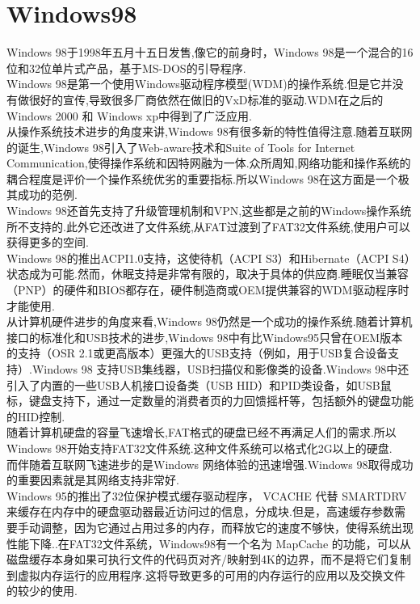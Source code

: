 \documentclass[a4paper,12pt,notitlepage]{article}
\begin{document}
\section{Windows98}

	Windows 98于1998年五月十五日发售,像它的前身时，Windows 98是一个混合的16位和32位单片式产品，基于MS-DOS的引导程序. \\
	
	Windows 98是第一个使用Windows驱动程序模型(WDM)的操作系统.但是它并没有做很好的宣传,导致很多厂商依然在做旧的VxD标准的驱动.WDM在之后的Windows 2000 和 Windows xp中得到了广泛应用. \\
	
	从操作系统技术进步的角度来讲,Windows 98有很多新的特性值得注意.随着互联网的诞生,Windows 98引入了Web-aware技术和Suite of Tools for Internet Communication,使得操作系统和因特网融为一体.众所周知,网络功能和操作系统的耦合程度是评价一个操作系统优劣的重要指标.所以Windows 98在这方面是一个极其成功的范例. \\
	
	Windows 98还首先支持了升级管理机制和VPN,这些都是之前的Windows操作系统所不支持的.此外它还改进了文件系统,从FAT过渡到了FAT32文件系统,使用户可以获得更多的空间. \\
	
	Windows 98的推出ACPI1.0支持，这使待机（ACPI S3）和Hibernate（ACPI S4）状态成为可能.然而，休眠支持是非常有限的，取决于具体的供应商.睡眠仅当兼容（PNP）的硬件和BIOS都存在，硬件制造商或OEM提供兼容的WDM驱动程序时才能使用. \\
	
	从计算机硬件进步的角度来看,Windows 98仍然是一个成功的操作系统.随着计算机接口的标准化和USB技术的进步,Windows 98中有比Windows95只曾在OEM版本的支持（OSR 2.1或更高版本）更强大的USB支持（例如，用于USB复合设备支持）.Windows 98 支持USB集线器，USB扫描仪和影像类的设备.Windows 98中还引入了内置的一些USB人机接口设备类（USB HID）和PID类设备，如USB鼠标，键盘支持下，通过一定数量的消费者页的力回馈摇杆等，包括额外的键盘功能的HID控制. \\
	
	随着计算机硬盘的容量飞速增长,FAT格式的硬盘已经不再满足人们的需求.所以Windows 98开始支持FAT32文件系统.这种文件系统可以格式化2G以上的硬盘. \\
	
	而伴随着互联网飞速进步的是Windows 网络体验的迅速增强.Windows 98取得成功的重要因素就是其网络支持非常好. \\
	
	Windows 95的推出了32位保护模式缓存驱动程序， VCACHE 代替  SMARTDRV 来缓存在内存中的硬盘驱动器最近访问过的信息，分成块.但是，高速缓存参数需要手动调整，因为它通过占用过多的内存，而释放它的速度不够快，使得系统出现性能下降..在FAT32文件系统，Windows98有一个名为 MapCache 的功能，可以从磁盘缓存本身如果可执行文件的代码页对齐/映射到4K的边界，而不是将它们复制到虚拟内存运行的应用程序.这将导致更多的可用的内存运行的应用以及交换文件的较少的使用. \\
	
\end{document}
